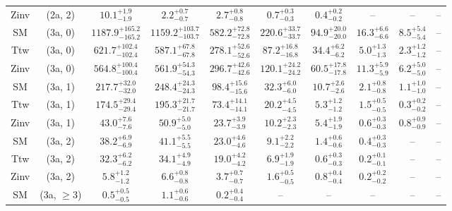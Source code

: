 \begin{table}[h!]
{\begin{tabular}{cccccccccc}
	Zinv & (2a, 2) & $10.1^{+ 1.9 }_{- 1.9 }$ & $2.2^{+ 0.7 }_{- 0.7 }$ & $2.7^{+ 0.8 }_{- 0.8 }$ & $0.7^{+ 0.3 }_{- 0.3 }$ & $0.4^{+ 0.2 }_{- 0.2 }$ & -- & -- & -- \\[0.5ex] 
	SM & (3a, 0) & $1187.9^{+ 165.2 }_{- 165.2 }$ & $1159.2^{+ 103.7 }_{- 103.7 }$ & $582.2^{+ 72.8 }_{- 72.8 }$ & $220.6^{+ 33.7 }_{- 33.7 }$ & $94.9^{+ 20.0 }_{- 20.0 }$ & $16.3^{+ 6.6 }_{- 6.6 }$ & $8.5^{+ 5.4 }_{- 5.4 }$ & -- \\[0.5ex] 
	Ttw & (3a, 0) & $621.7^{+ 102.4 }_{- 102.4 }$ & $587.1^{+ 67.8 }_{- 67.8 }$ & $278.1^{+ 52.6 }_{- 52.6 }$ & $87.2^{+ 16.8 }_{- 16.8 }$ & $34.4^{+ 6.2 }_{- 6.2 }$ & $5.0^{+ 1.3 }_{- 1.3 }$ & $2.3^{+ 1.2 }_{- 1.2 }$ & -- \\[0.5ex] 
	Zinv & (3a, 0) & $564.8^{+ 100.4 }_{- 100.4 }$ & $561.9^{+ 54.3 }_{- 54.3 }$ & $296.7^{+ 42.6 }_{- 42.6 }$ & $120.1^{+ 24.2 }_{- 24.2 }$ & $60.5^{+ 17.8 }_{- 17.8 }$ & $11.3^{+ 5.9 }_{- 5.9 }$ & $6.2^{+ 5.0 }_{- 5.0 }$ & -- \\[0.5ex] 
	SM & (3a, 1) & $217.7^{+ 32.0 }_{- 32.0 }$ & $248.4^{+ 24.3 }_{- 24.3 }$ & $98.4^{+ 15.6 }_{- 15.6 }$ & $32.3^{+ 6.0 }_{- 6.0 }$ & $10.7^{+ 2.6 }_{- 2.6 }$ & $2.1^{+ 0.8 }_{- 0.8 }$ & $1.1^{+ 1.0 }_{- 1.0 }$ & -- \\[0.5ex] 
	Ttw & (3a, 1) & $174.5^{+ 29.4 }_{- 29.4 }$ & $195.3^{+ 21.7 }_{- 21.7 }$ & $73.4^{+ 14.1 }_{- 14.1 }$ & $20.2^{+ 4.5 }_{- 4.5 }$ & $5.3^{+ 1.2 }_{- 1.2 }$ & $1.5^{+ 0.5 }_{- 0.5 }$ & $0.3^{+ 0.2 }_{- 0.2 }$ & -- \\[0.5ex] 
	Zinv & (3a, 1) & $43.0^{+ 7.6 }_{- 7.6 }$ & $50.9^{+ 5.0 }_{- 5.0 }$ & $23.7^{+ 3.9 }_{- 3.9 }$ & $10.2^{+ 2.3 }_{- 2.3 }$ & $5.4^{+ 1.9 }_{- 1.9 }$ & $0.6^{+ 0.3 }_{- 0.3 }$ & $0.8^{+ 0.9 }_{- 0.9 }$ & -- \\[0.5ex] 
	SM & (3a, 2) & $38.2^{+ 6.9 }_{- 6.9 }$ & $41.1^{+ 5.5 }_{- 5.5 }$ & $23.0^{+ 4.6 }_{- 4.6 }$ & $9.1^{+ 2.2 }_{- 2.2 }$ & $1.4^{+ 0.6 }_{- 0.6 }$ & $0.4^{+ 0.3 }_{- 0.3 }$ & -- & -- \\[0.5ex] 
	Ttw & (3a, 2) & $32.3^{+ 6.2 }_{- 6.2 }$ & $34.1^{+ 4.9 }_{- 4.9 }$ & $19.0^{+ 4.2 }_{- 4.2 }$ & $6.9^{+ 1.9 }_{- 1.9 }$ & $0.6^{+ 0.3 }_{- 0.3 }$ & $0.2^{+ 0.1 }_{- 0.1 }$ & -- & -- \\[0.5ex] 
	Zinv & (3a, 2) & $5.8^{+ 1.2 }_{- 1.2 }$ & $6.6^{+ 0.8 }_{- 0.8 }$ & $3.7^{+ 0.7 }_{- 0.7 }$ & $1.6^{+ 0.5 }_{- 0.5 }$ & $0.8^{+ 0.4 }_{- 0.4 }$ & $0.2^{+ 0.2 }_{- 0.2 }$ & -- & -- \\[0.5ex] 
	SM & (3a, $\ge3$) & $0.5^{+ 0.5 }_{- 0.5 }$ & $1.1^{+ 0.6 }_{- 0.6 }$ & $0.2^{+ 0.4 }_{- 0.4 }$ & -- & -- & -- & -- & -- \\[0.5ex] 

\end{tabular}}
\end{table}
